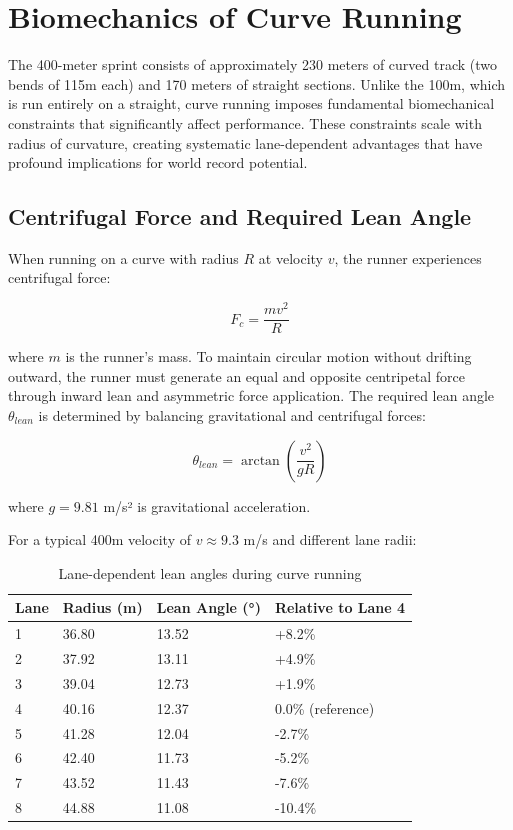 \section{Biomechanics of Curve Running}

The 400-meter sprint consists of approximately 230 meters of curved track (two bends of 115m each) and 170 meters of straight sections. Unlike the 100m, which is run entirely on a straight, curve running imposes fundamental biomechanical constraints that significantly affect performance. These constraints scale with radius of curvature, creating systematic lane-dependent advantages that have profound implications for world record potential.

\subsection{Centrifugal Force and Required Lean Angle}

When running on a curve with radius $R$ at velocity $v$, the runner experiences centrifugal force:

\begin{equation}
F_c = \frac{mv^2}{R}
\end{equation}

where $m$ is the runner's mass. To maintain circular motion without drifting outward, the runner must generate an equal and opposite centripetal force through inward lean and asymmetric force application. The required lean angle $\theta_{lean}$ is determined by balancing gravitational and centrifugal forces:

\begin{equation}
\theta_{lean} = \arctan\left(\frac{v^2}{gR}\right)
\end{equation}

where $g = 9.81$ m/s² is gravitational acceleration.

For a typical 400m velocity of $v \approx 9.3$ m/s and different lane radii:

\begin{table}[H]
\centering
\caption{Lane-dependent lean angles during curve running}
\begin{tabular}{@{}llll@{}}
\toprule
\textbf{Lane} & \textbf{Radius (m)} & \textbf{Lean Angle (°)} & \textbf{Relative to Lane 4} \\
\midrule
1 & 36.80 & 13.52 & +8.2\% \\
2 & 37.92 & 13.11 & +4.9\% \\
3 & 39.04 & 12.73 & +1.9\% \\
4 & 40.16 & 12.37 & 0.0\% (reference) \\
5 & 41.28 & 12.04 & -2.7\% \\
6 & 42.40 & 11.73 & -5.2\% \\
7 & 43.52 & 11.43 & -7.6\% \\
8 & 44.88 & 11.08 & -10.4\% \\
\bottomrule
\end{tabular}
\end{table}

